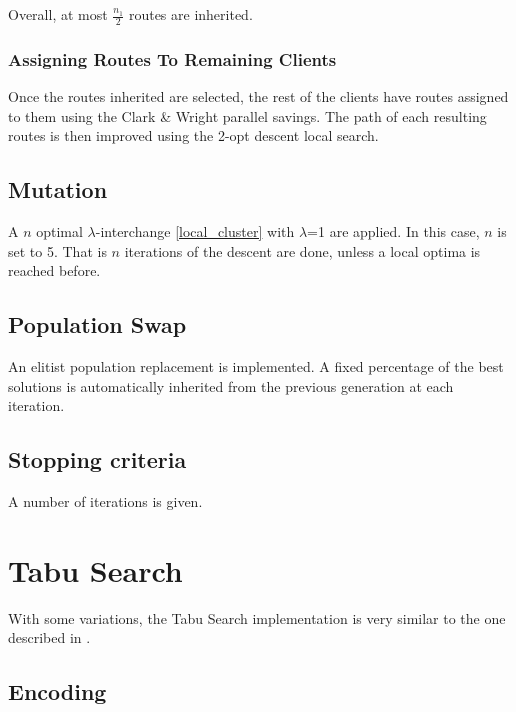 \documentclass{article} %
\begin{document}
Overall, at most $\frac{n_1}{2}$ routes are inherited.

\subsubsection{Assigning Routes To Remaining Clients}

Once the routes inherited are selected, the rest of the clients have routes assigned to them using the Clark \& Wright parallel savings. The path of each resulting routes is then improved using the 2-opt descent local search.


\subsection{Mutation}

A $n$ optimal $\lambda$-interchange \ref{local_cluster} with $\lambda$=1 are applied. In this case, $n$ is set to 5. That is $n$ iterations of the descent are done, unless a local optima is reached before.


\subsection{Population Swap}

An elitist population replacement is implemented. A fixed percentage of the best solutions is automatically inherited from the previous generation at each iteration.


\subsection{Stopping criteria}

A number of iterations is given.


\newpage
\section{Tabu Search}
\label{tabu_search}

With some variations, the Tabu Search implementation is very similar to the one described in \citep{osman1993}.


\subsection{Encoding}
\end{document}
